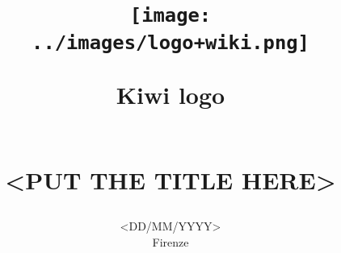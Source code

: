 \begin{titlepage}
\title{
	\begin{figure} 
	 \centering 
	 \texttt{[image: ../images/logo+wiki.png]} 
	 \caption{Kiwi logo} 
	 \label{Kiwi_logo} 
	\end{figure} \\
	<PUT THE TITLE HERE>
}

\date{<DD/MM/YYYY> \\Firenze}
\end{titlepage}

